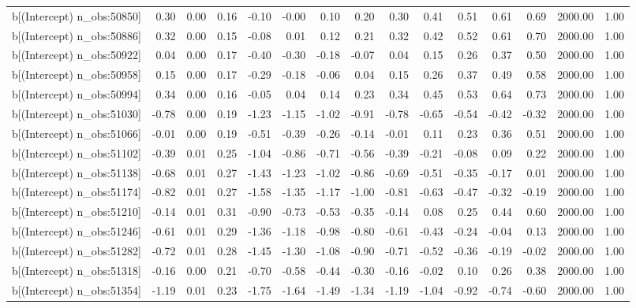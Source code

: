 \begin{table}[ht]
\begin{tabular}{rrrrrrrrrrrrrrr}
  b[(Intercept) n\_obs:50850] & 0.30 & 0.00 & 0.16 & -0.10 & -0.00 & 0.10 & 0.20 & 0.30 & 0.41 & 0.51 & 0.61 & 0.69 & 2000.00 & 1.00 \\ 
  b[(Intercept) n\_obs:50886] & 0.32 & 0.00 & 0.15 & -0.08 & 0.01 & 0.12 & 0.21 & 0.32 & 0.42 & 0.52 & 0.61 & 0.70 & 2000.00 & 1.00 \\ 
  b[(Intercept) n\_obs:50922] & 0.04 & 0.00 & 0.17 & -0.40 & -0.30 & -0.18 & -0.07 & 0.04 & 0.15 & 0.26 & 0.37 & 0.50 & 2000.00 & 1.00 \\ 
  b[(Intercept) n\_obs:50958] & 0.15 & 0.00 & 0.17 & -0.29 & -0.18 & -0.06 & 0.04 & 0.15 & 0.26 & 0.37 & 0.49 & 0.58 & 2000.00 & 1.00 \\ 
  b[(Intercept) n\_obs:50994] & 0.34 & 0.00 & 0.16 & -0.05 & 0.04 & 0.14 & 0.23 & 0.34 & 0.45 & 0.53 & 0.64 & 0.73 & 2000.00 & 1.00 \\ 
  b[(Intercept) n\_obs:51030] & -0.78 & 0.00 & 0.19 & -1.23 & -1.15 & -1.02 & -0.91 & -0.78 & -0.65 & -0.54 & -0.42 & -0.32 & 2000.00 & 1.00 \\ 
  b[(Intercept) n\_obs:51066] & -0.01 & 0.00 & 0.19 & -0.51 & -0.39 & -0.26 & -0.14 & -0.01 & 0.11 & 0.23 & 0.36 & 0.51 & 2000.00 & 1.00 \\ 
  b[(Intercept) n\_obs:51102] & -0.39 & 0.01 & 0.25 & -1.04 & -0.86 & -0.71 & -0.56 & -0.39 & -0.21 & -0.08 & 0.09 & 0.22 & 2000.00 & 1.00 \\ 
  b[(Intercept) n\_obs:51138] & -0.68 & 0.01 & 0.27 & -1.43 & -1.23 & -1.02 & -0.86 & -0.69 & -0.51 & -0.35 & -0.17 & 0.01 & 2000.00 & 1.00 \\ 
  b[(Intercept) n\_obs:51174] & -0.82 & 0.01 & 0.27 & -1.58 & -1.35 & -1.17 & -1.00 & -0.81 & -0.63 & -0.47 & -0.32 & -0.19 & 2000.00 & 1.00 \\ 
  b[(Intercept) n\_obs:51210] & -0.14 & 0.01 & 0.31 & -0.90 & -0.73 & -0.53 & -0.35 & -0.14 & 0.08 & 0.25 & 0.44 & 0.60 & 2000.00 & 1.00 \\ 
  b[(Intercept) n\_obs:51246] & -0.61 & 0.01 & 0.29 & -1.36 & -1.18 & -0.98 & -0.80 & -0.61 & -0.43 & -0.24 & -0.04 & 0.13 & 2000.00 & 1.00 \\ 
  b[(Intercept) n\_obs:51282] & -0.72 & 0.01 & 0.28 & -1.45 & -1.30 & -1.08 & -0.90 & -0.71 & -0.52 & -0.36 & -0.19 & -0.02 & 2000.00 & 1.00 \\ 
  b[(Intercept) n\_obs:51318] & -0.16 & 0.00 & 0.21 & -0.70 & -0.58 & -0.44 & -0.30 & -0.16 & -0.02 & 0.10 & 0.26 & 0.38 & 2000.00 & 1.00 \\ 
  b[(Intercept) n\_obs:51354] & -1.19 & 0.01 & 0.23 & -1.75 & -1.64 & -1.49 & -1.34 & -1.19 & -1.04 & -0.92 & -0.74 & -0.60 & 2000.00 & 1.00 \\ 

\end{tabular}
\end{table}
